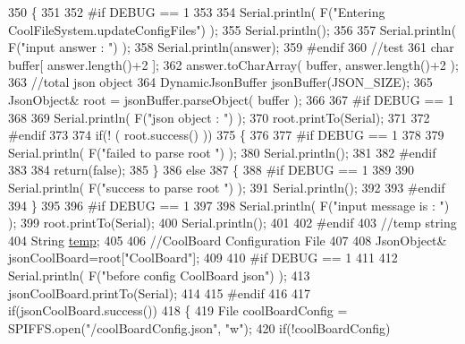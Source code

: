 \begin{DoxyCode}
350 \{
351 
352 \textcolor{preprocessor}{#if DEBUG == 1}
353 
354     Serial.println( F(\textcolor{stringliteral}{"Entering CoolFileSystem.updateConfigFiles"}) );
355     Serial.println();
356     
357     Serial.println( F(\textcolor{stringliteral}{"input answer : "}) );
358     Serial.println(answer);
359 \textcolor{preprocessor}{#endif}
360     \textcolor{comment}{//test}
361     \textcolor{keywordtype}{char} buffer[ answer.length()+2 ];
362     answer.toCharArray( buffer, answer.length()+2  );
363     \textcolor{comment}{//total json object }
364     DynamicJsonBuffer jsonBuffer(JSON\_SIZE);
365     JsonObject& root = jsonBuffer.parseObject( buffer );
366 
367 \textcolor{preprocessor}{#if DEBUG == 1}
368 
369     Serial.println( F(\textcolor{stringliteral}{"json object : "}) );  
370     root.printTo(Serial);
371 
372 \textcolor{preprocessor}{#endif}
373 
374     \textcolor{keywordflow}{if}(! ( root.success() ))
375     \{
376     
377 \textcolor{preprocessor}{    #if DEBUG == 1}
378 
379         Serial.println( F(\textcolor{stringliteral}{"failed to parse root "}) );
380         Serial.println();
381     
382 \textcolor{preprocessor}{    #endif}
383 
384         \textcolor{keywordflow}{return}(\textcolor{keyword}{false});
385     \}
386     \textcolor{keywordflow}{else}
387     \{
388 \textcolor{preprocessor}{    #if DEBUG == 1}
389         
390         Serial.println( F(\textcolor{stringliteral}{"success to parse root "}) );
391         Serial.println();
392         
393 \textcolor{preprocessor}{    #endif  }
394     \}
395     
396 \textcolor{preprocessor}{#if DEBUG == 1}
397 
398     Serial.println( F(\textcolor{stringliteral}{"input message is : "}) );
399     root.printTo(Serial);
400     Serial.println();
401 
402 \textcolor{preprocessor}{#endif}
403     \textcolor{comment}{//temp string}
404     String \hyperlink{Irene3000_8h_a5905d48604152cf57aa6bfa087b49173}{temp};
405 
406     \textcolor{comment}{//CoolBoard Configuration File}
407 
408         JsonObject& jsonCoolBoard=root[\textcolor{stringliteral}{"CoolBoard"}];
409 
410 \textcolor{preprocessor}{#if DEBUG == 1}
411 
412     Serial.println( F(\textcolor{stringliteral}{"before config CoolBoard json"}) );
413     jsonCoolBoard.printTo(Serial);
414 
415 \textcolor{preprocessor}{#endif}
416 
417     \textcolor{keywordflow}{if}(jsonCoolBoard.success())
418     \{
419         File coolBoardConfig = SPIFFS.open(\textcolor{stringliteral}{"/coolBoardConfig.json"}, \textcolor{stringliteral}{"w"});   
420         \textcolor{keywordflow}{if}(!coolBoardConfig)

\end{DoxyCode}
